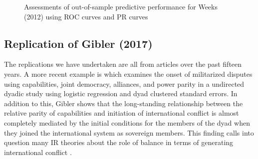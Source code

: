 \begin{figure}
\centering   
	\caption{Assessments of out-of-sample predictive performance for Weeks (2012) using ROC curves and PR curves}
\end{figure}
\FloatBarrier

\subsection{Replication of Gibler (2017)}


The replications we have undertaken are all from articles over the past fifteen years.  A more recent example is \citet{gibler:2017} which examines the onset of militarized disputes using capabilities, joint democracy, alliances, and power parity in a undirected dyadic study using logistic regression and dyad clustered standard errors.   In addition to this, Gibler shows that the long-standing relationship between the relative parity of capabilities and initiation of international conflict is almost completely mediated by the initial conditions for the members of the dyad when they joined the international system as sovereign members. This finding calls into question many IR theories about the role of balance in terms of generating international conflict \citep{organski:1958}.


